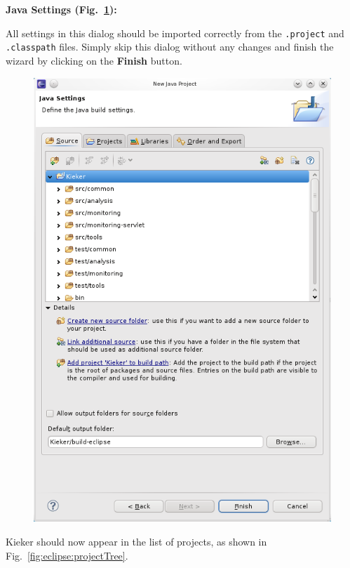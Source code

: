 \begin{compactenum}
\begin{compactenum}
\item \textbf{Java Settings (Fig.~\ref{fig:eclipse:javaSettings}):} %

All settings in this dialog should be imported correctly from the \texttt{.project} %
and \texttt{.classpath} files. Simply skip this dialog without any changes and finish the wizard by clicking %
on the \textbf{Finish} button.

\begin{figure}[H]\centering
\includegraphics[scale=0.4]{figures/eclipse-JavaSettings}
\caption{}
\label{fig:eclipse:javaSettings}
\end{figure}

\item Kieker should now appear in the list of projects, as shown in Fig.~\ref{fig:eclipse:projectTree}.  


\end{compactenum}
\end{compactenum}
